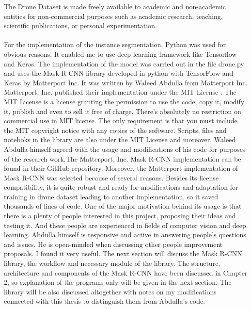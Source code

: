 The Drone Dataset is made freely available to academic and non-academic entities for non-commercial purposes such as academic research, teaching, scientific publications, or personal experimentation.
\paragraph{}
For the implementation of the instance segmentation, Python was used for obvious reasons. It enabled me to use deep learning framework like Tensorflow and Keras. The implementation of the model was carried out in the file drone.py and uses the Mask R-CNN library developed in python with TensorFlow and Keras by Matterport Inc. It was written by Waleed Abdulla from Matterport Inc. Matterport, Inc. published their implementation under the MIT License \cite{X}. The MIT License is a license granting the permission to use the code, copy it, modify it, publish and even to sell it free of charge.
There's absolutely no restriction on commercial use in MIT license. The only requirement is that you must include the MIT copyright notice with any copies of the software. Scripts, files and noteboks in the library are also under the MIT License and moreover, Waleed Abdulla himself agreed with the usage and modifications of his code for purposes of the research work.The Matterport, Inc. Mask R-CNN implementation can be found in their GitHub repository.
Moreover, the Matterport implementation of Mask R-CNN was selected because of several reasons. Besides its license compatibility, it is quite robust and ready for modifications and adaptation for training in drone dataset leading to another implementation, so it saved thousands of lines of code. One of the major motivation behind its usage is that there is a plenty of people interested in this project, proposing their ideas and testing it. And these people are experienced in fields of computer vision and deep learning. Abdulla himself is responsive and active in answering people’s questions and issues. He is open-minded when discussing other people improvement proposals. I found it very useful.
The next section will discuss the Mask R-CNN library, the workflow and necessary module of the library. The structure, architecture and components of the Mask R-CNN have been discussed in Chapter 2, so explanation of the programs only will be given in the next section. The library will be also discussed altogether with notes on my modifications connected with this thesis to distinguish them from Abdulla’s code.

